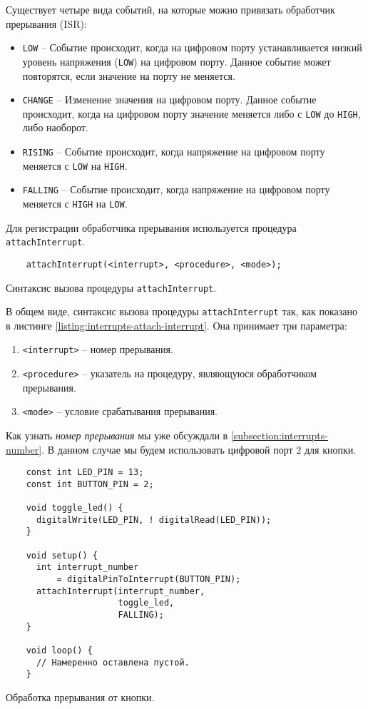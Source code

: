 \documentclass[../sparc.tex]{subfiles}
\begin{document}
Существует четыре вида событий, на которые можно привязать обработчик прерывания
(\gls{ISR}):
\begin{itemize}
\item \texttt{LOW} -- Событие происходит, когда на цифровом порту устанавливается
  низкий уровень напряжения (\texttt{LOW}) на цифровом порту.  Данное событие
  может повторятся, если значение на порту не меняется.
\item \texttt{CHANGE} -- Изменение значения на цифровом порту.  Данное событие
  происходит, когда на цифровом порту значение меняется либо с \texttt{LOW} до
  \texttt{HIGH}, либо наоборот.
\item \texttt{RISING} -- Событие происходит, когда напряжение на цифровом порту
  меняется с \texttt{LOW} на \texttt{HIGH}.
\item \texttt{FALLING} -- Событие происходит, когда напряжение на цифровом порту
  меняется с \texttt{HIGH} на \texttt{LOW}.
\end{itemize}

Для регистрации обработчика прерывания используется процедура
\texttt{attachInterrupt}.

\begin{listing}[H]
  \begin{verbatim}
    attachInterrupt(<interrupt>, <procedure>, <mode>);
  \end{verbatim}
  \caption{Синтаксис вызова процедуры \texttt{attachInterrupt}.}
  \label{listing:interrupts-attach-interrupt}
\end{listing}

В общем виде, синтаксис вызова процедуры \texttt{attachInterrupt} так, как
показано в листинге \ref{listing:interrupts-attach-interrupt}.  Она принимает
три параметра:
\begin{enumerate}
\item \texttt{<interrupt>} -- номер прерывания.
\item \texttt{<procedure>} -- указатель на процедуру, являющуюся обработчиком
  прерывания.
\item \texttt{<mode>} -- условие срабатывания прерывания.
\end{enumerate}

Как узнать \emph{номер прерывания} мы уже обсуждали в
\ref{subsection:interrupts-number}.  В данном случае мы будем использовать
цифровой порт 2 для кнопки.

\begin{listing}[H]
  \begin{verbatim}
    const int LED_PIN = 13;
    const int BUTTON_PIN = 2;

    void toggle_led() {
      digitalWrite(LED_PIN, ! digitalRead(LED_PIN));
    }

    void setup() {
      int interrupt_number
          = digitalPinToInterrupt(BUTTON_PIN);
      attachInterrupt(interrupt_number,
                      toggle_led,
                      FALLING);
    }

    void loop() {
      // Намеренно оставлена пустой.
    }
  \end{verbatim}
  \caption{Обработка прерывания от кнопки.}
  \label{listing:interrupts-handler}
\end{listing}
\end{document}
